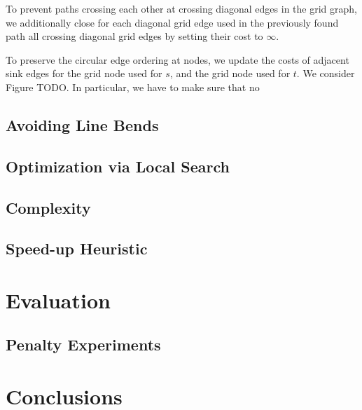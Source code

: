 \documentclass{sig-alternate-sigmod09}
\begin{document}
To prevent paths crossing each other at crossing diagonal edges in the grid graph, we additionally close for each diagonal grid edge used in the previously found path all crossing diagonal grid edges by setting their cost to $\infty$.

To preserve the circular edge ordering at nodes, we update the costs of adjacent sink edges for the grid node used for $s$, and the grid node used for $t$.
We consider Figure TODO.
In particular, we have to make sure that no 

\subsection{Avoiding Line Bends}

\subsection{Optimization via Local Search}

\subsection{Complexity}

\subsection{Speed-up Heuristic}

\section{Evaluation}

\subsection{Penalty Experiments}

\section{Conclusions}


\balancecolumns
\end{document}
